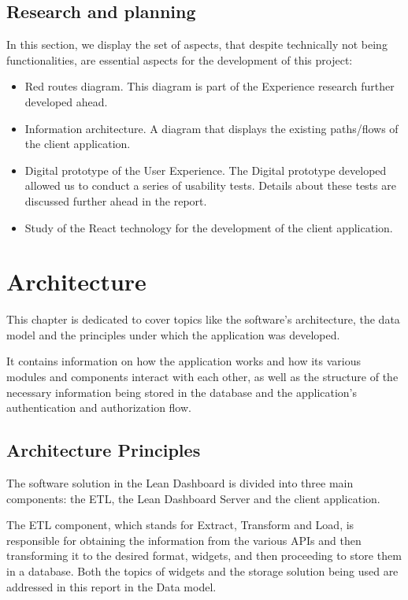 \documentclass[a4paper,twoside,10pt]{report}
\begin{document}
\section{Research and planning}
In this section, we display the set of aspects, that despite technically not being functionalities, are essential aspects for the development of this project:

\begin{itemize}
    \item Red routes diagram. This diagram is part of the Experience research further developed ahead.
    \item Information architecture\cite{INFOARCH}. A diagram that displays the existing paths/flows of the client application.
    \item Digital prototype of the User Experience. The Digital prototype developed allowed us to conduct a series of usability tests. Details about these tests are discussed further ahead in the report.
    \item Study of the React\cite{REACT} technology for the development of the client application.
\end{itemize}

\chapter{Architecture}
This chapter is dedicated to cover topics like the software's architecture, the data model and the principles under which the application was developed. 

It contains information on how the application works and how its various modules and components interact with each other, as well as the structure of the necessary information being stored in the database and the application's authentication and authorization flow.
\section{Architecture Principles}
The software solution in the Lean Dashboard is divided into three main components: the ETL\cite{ETLPROC}, the Lean Dashboard Server and the client application.
 
The ETL component, which stands for Extract, Transform and Load, is responsible for obtaining the information from the various APIs and then transforming it to the desired format, widgets, and then proceeding to store them in a database. Both the topics of widgets and the storage solution being used are addressed in this report in the Data model.
 
\end{document}
